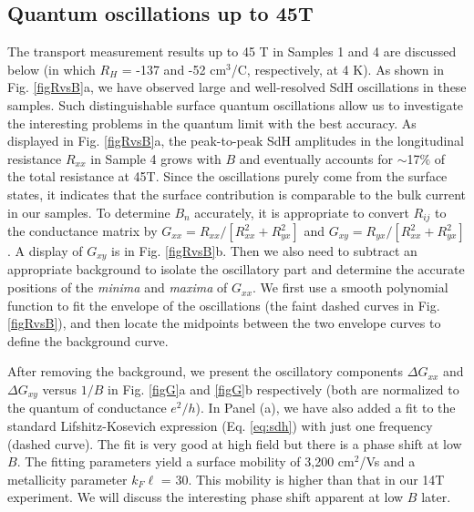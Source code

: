 \subsection{Quantum oscillations up to 45T}

The transport measurement results up to 45 T in Samples 1 and 4 are discussed below (in which $R_H$ = -137 and -52 cm$^3$/C, respectively, at 4 K). As shown in Fig. \ref{figRvsB}a, we have observed large and well-resolved SdH oscillations in these samples. Such distinguishable surface quantum oscillations allow us to investigate the interesting problems in the quantum limit with the best accuracy. As displayed in Fig. \ref{figRvsB}a, the peak-to-peak SdH amplitudes in the longitudinal resistance $R_{xx}$ in Sample 4 grows with $B$ and eventually accounts for $\sim$17$\%$ of the total resistance at 45T. Since the oscillations purely come from the surface states, it indicates that the surface contribution is comparable to the bulk current in our samples. To determine $B_n$ accurately, it is appropriate to convert $R_{ij}$ to the conductance matrix by $G_{xx} = R_{xx}/[R_{xx}^2+R_{yx}^2]$ and $G_{xy}= R_{yx}/[R_{xx}^2+R_{yx}^2]$. A display of $G_{xy}$ is in Fig. \ref{figRvsB}b. Then we also need to subtract an appropriate background to isolate the oscillatory part and determine the accurate positions of the \emph{minima} and \emph{maxima} of  $G_{xx}$. We first use a smooth polynomial function to fit the envelope of the oscillations (the faint dashed curves in Fig. \ref{figRvsB}), and then locate the midpoints between the two envelope curves to define the background curve.


After removing the background, we present the oscillatory components $\Delta G_{xx}$ and $\Delta G_{xy}$ versus $1/B$ in Fig. \ref{figG}a and \ref{figG}b respectively (both are normalized to the quantum of conductance $e^2/h$).
In Panel (a), we have also added a fit to the standard Lifshitz-Kosevich expression (Eq. \ref{eq:sdh}) with just
one frequency (dashed curve). The fit is very good at high field but there is a phase shift at low $B$. The fitting parameters yield a surface mobility of 3,200 cm$^2$/Vs and a metallicity parameter $k_F\ell$ = 30. This mobility is higher than that in our 14T experiment. We will discuss the interesting phase shift apparent at low $B$ later.



